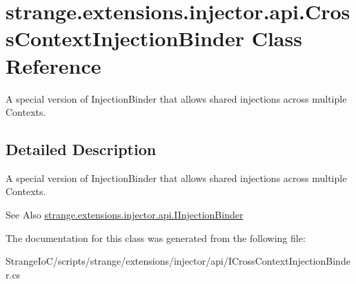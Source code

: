 \hypertarget{classstrange_1_1extensions_1_1injector_1_1api_1_1_cross_context_injection_binder}{\section{strange.\-extensions.\-injector.\-api.\-Cross\-Context\-Injection\-Binder Class Reference}
\label{classstrange_1_1extensions_1_1injector_1_1api_1_1_cross_context_injection_binder}
}


A special version of Injection\-Binder that allows shared injections across multiple Contexts.  




\subsection{Detailed Description}
A special version of Injection\-Binder that allows shared injections across multiple Contexts. 

\begin{DoxySeeAlso}{See Also}
\hyperlink{interfacestrange_1_1extensions_1_1injector_1_1api_1_1_i_injection_binder}{strange.\-extensions.\-injector.\-api.\-I\-Injection\-Binder} 
\end{DoxySeeAlso}


The documentation for this class was generated from the following file\-:\begin{DoxyCompactItemize}
\item 
Strange\-Io\-C/scripts/strange/extensions/injector/api/I\-Cross\-Context\-Injection\-Binder.\-cs\end{DoxyCompactItemize}
